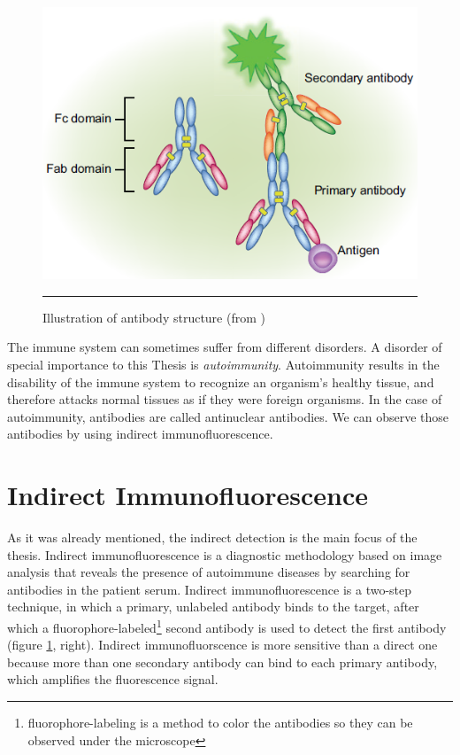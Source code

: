 \begin{figure}[htbp]
	\centering
	\includegraphics[scale=0.5]{Figures/Domain/antibodies}
	\rule{35em}{0.5pt}
	\caption[Illustration of antibody structure]{Illustration of antibody structure (from \cite{OdellCook2013})}
	\label{fig:AntibodyIllustration}

\end{figure}

The immune system can sometimes suffer from different disorders. A disorder of special importance to this Thesis is  \textit{autoimmunity}. Autoimmunity results in the disability of the immune system to recognize an organism's healthy tissue, and therefore attacks normal tissues as if they were foreign organisms. In the case of autoimmunity, antibodies are called antinuclear antibodies. We can observe those antibodies by using indirect immunofluorescence.

\section{Indirect Immunofluorescence}

As it was already mentioned, the indirect detection is the main focus of the thesis. Indirect immunofluorescence is a diagnostic methodology based on image analysis that reveals the presence of autoimmune diseases by searching for antibodies in the patient serum. Indirect immunofluorescence is a two-step technique, in which a primary, unlabeled antibody binds to the target, after which a fluorophore-labeled\footnote{fluorophore-labeling is a method to color the antibodies so they can be observed under the microscope} second antibody is used to detect the first antibody (figure \ref{fig:AntibodyIllustration}, right). Indirect immunofluorscence is more sensitive than a direct one because more than one secondary antibody can bind to each primary antibody, which amplifies the fluorescence signal.

